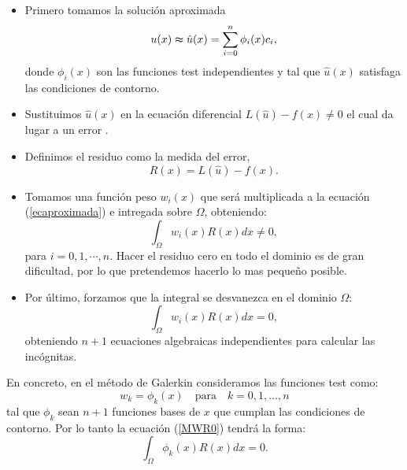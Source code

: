     \begin{itemize}
        \item Primero tomamos la solución aproximada
        \begin{equation}
        \label{ecaproximada}
            u(x)\thickapprox \hat{u}(x)=\displaystyle\sum_{i=0}^{n}\phi_{i}(x)c_{i},
        \end{equation}
        donde $\phi_{i}(x)$ son las funciones test independientes y tal que $\hat{u}(x)$ satisfaga las condiciones de contorno.
        
        \item Sustituimos $\hat{u}(x)$ en la ecuación diferencial $L(\hat{u})-f(x)\neq 0$ el cual da lugar a un error .
        
        \item Definimos el residuo como la medida del error,
        \begin{equation}
        \label{residuo}
            R(x)=L(\hat{u})-f(x).
        \end{equation}
        
        \item Tomamos una función peso $w_{i}(x)$ que será multiplicada a la ecuación (\ref{ecaproximada}) e intregada sobre $\Omega$, obteniendo:
        \begin{equation}
         \displaystyle\int_{\Omega}w_{i}(x)R(x)dx\neq 0,
        \end{equation}
        para $i=0,1,\cdots,n$. Hacer el residuo cero en todo el dominio es de gran dificultad, por lo que pretendemos hacerlo lo mas pequeño posible.
        \item Por último, forzamos que la integral se desvanezca en el dominio $\Omega$:
        \begin{equation}
           \label{MWR0} \displaystyle\int_{\Omega}w_{i}(x)R(x)dx = 0,
        \end{equation}
        obteniendo $n+1$ ecuaciones algebraicas independientes para calcular las incógnitas.
    \end{itemize}
    
    En concreto, en el método de Galerkin consideramos las funciones test como:
    $$w_{k}=\phi_{k}(x) \quad \mbox{para} \quad k=0,1,\ldots,n$$ tal que $\phi_{k}$ sean $n+1$ funciones bases de $x$ que cumplan las condiciones de contorno. Por lo tanto la ecuación (\ref{MWR0}) tendrá la forma:
    \begin{equation}
         \displaystyle\int_{\Omega}\phi_{k}(x)R(x)dx = 0.
    \end{equation}

